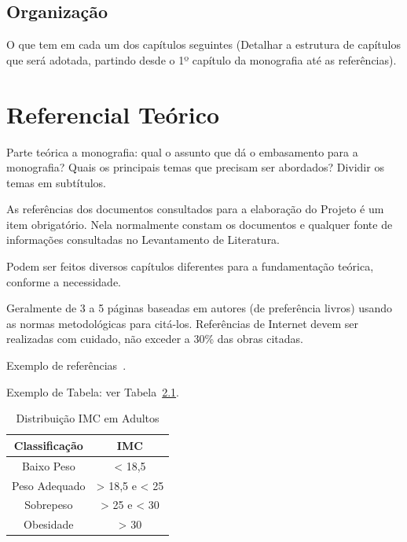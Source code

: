 \documentclass[
	12pt,				    %
	openright,			    %
	oneside,			    %
	a4paper,			    %
    sumario=tradicional,    %
	english,			    %
	brazil,				    %
	]{abntex2}
\begin{document}
\section{Organização}\label{sec:Organizacao}

O que tem em cada um dos capítulos seguintes (Detalhar a estrutura de capítulos que será adotada, partindo desde o 1º capítulo da monografia até as referências).

\chapter{Referencial Teórico}\label{sec:RefTeorico}\thispagestyle{empty}

Parte teórica a monografia: qual o assunto que dá o embasamento para a monografia? Quais os principais temas que precisam ser abordados? Dividir os temas em subtítulos. 

As referências dos documentos consultados para a elaboração do Projeto é um item obrigatório. Nela normalmente constam os documentos e qualquer fonte de informações consultadas no Levantamento de Literatura. 

Podem ser feitos diversos capítulos diferentes para a fundamentação teórica, conforme a necessidade.

Geralmente de 3 a 5 páginas baseadas em autores (de preferência livros) usando as normas metodológicas para citá-los. Referências de Internet devem ser realizadas com cuidado, não exceder a 30\% das obras citadas.

Exemplo de refer\^encias~\cite{tese2019, confinter2019, confnac2019, site2019}.

Exemplo de Tabela: ver Tabela~\ref{tab:exetab}.

\begin{table}[!ht]
\begin{center}
\caption{Distribuição IMC em Adultos}
\label{tab:exetab}
\begin{tabular}{|c |c |}
\hline
\textbf{\textbf{Classificação}} & \textbf{IMC}\\
\hline\hline
Baixo Peso & < 18,5 \\
Peso Adequado & > 18,5 e < 25 \\
Sobrepeso & > 25 e < 30 \\
Obesidade & > 30 \\
\hline
\end{tabular}
\end{center}
\end{table}
\end{document}
